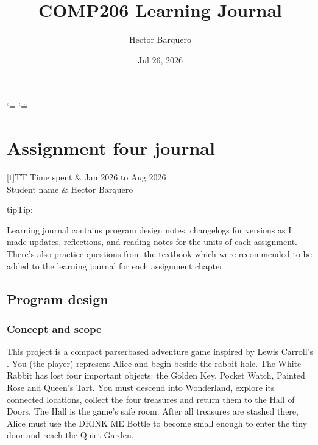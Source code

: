\documentclass[letterpaper,10pt,english]{sphinxmanual}
\title{COMP206 Learning Journal}
\date{Jul 26, 2026}
\author{Hector Barquero}
\begin{document}
\ifdefined\shorthandoff
  \ifnum\catcode`\=\string=\active\shorthandoff{=}\fi
  \ifnum\catcode`\"=\active{}\fi
\fi

\pagestyle{empty}
\sphinxmaketitle
\pagestyle{plain}
\sphinxtableofcontents
\pagestyle{normal}
\label{\detokenize{index::doc}}


\sphinxstepscope


\chapter{Assignment four journal}
\label{\detokenize{AssignmentFour/main:assignment-four-journal}}\label{\detokenize{AssignmentFour/main::doc}}

\begin{savenotes}\sphinxattablestart
\sphinxthistablewithglobalstyle
\centering
\begin{tabulary}{\linewidth}[t]{TT}
\sphinxtoprule
\sphinxtableatstartofbodyhook
\sphinxAtStartPar
Time spent
&
\sphinxAtStartPar
Jan 2026 to Aug 2026
\\
\sphinxhline
\sphinxAtStartPar
Student name
&
\sphinxAtStartPar
Hector Barquero
\\
\sphinxbottomrule
\end{tabulary}
\sphinxtableafterendhook\par
\sphinxattableend\end{savenotes}

\begin{sphinxadmonition}{tip}{Tip:}
\sphinxAtStartPar
{}

\sphinxAtStartPar
Learning journal contains program design notes, changelogs for versions as I made updates, reflections, and reading notes for the units of each assignment. There’s also practice questions from the textbook which were recommended to be added to the learning journal for each assignment chapter.
\end{sphinxadmonition}


\section{Program design}
\label{\detokenize{AssignmentFour/main:program-design}}

\subsection{Concept and scope}
\label{\detokenize{AssignmentFour/main:concept-and-scope}}
\sphinxAtStartPar
This project is a compact parser\sphinxhyphen{}based adventure game inspired by Lewis
Carroll’s . You (the player) represent Alice and
begin beside the rabbit hole. The White Rabbit has lost four important
objects: the Golden Key, Pocket Watch, Painted Rose and Queen’s Tart. You
must descend into Wonderland, explore its connected locations, collect the four
treasures and return them to the Hall of Doors. The Hall is the game’s safe
room. After all treasures are stashed there, Alice must use the DRINK ME Bottle
to become small enough to enter the tiny door and reach the Quiet Garden.
\end{document}
